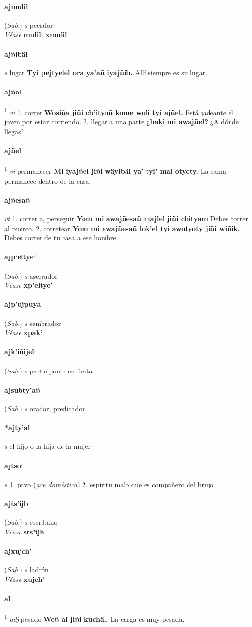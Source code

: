 \documentclass{scrbook}
\newcommand{\entry}[1]{\paragraph{#1}}
\newcommand{\onedefinition}[1]{#1.}
\newcommand{\defsuperscript}[1]{\textsuperscript{1}}
\newcommand{\partofspeech}[1]{\textit{#1}}
\newcommand{\spanishtranslation}[1]{#1}
\newcommand{\clarification}[1]{(\textit{#1})}
\newcommand{\cholexample}[1]{\textbf{#1}}
\newcommand{\exampletranslation}[1]{#1}
\newcommand{\alsosee}[1]{\\\textit{Véase} \textbf{#1}}
\newcommand{\relevantdialect}[1]{(\textit{#1})}
\begin{document}
\begin{multicols}{2}
\entry{ajmulil}
\relevantdialect{Sab.}
\partofspeech{s}
\spanishtranslation{pecador}
\alsosee{mulil, xmulil}

\entry{ajñibäl}
\partofspeech{s}
\spanishtranslation{lugar}
\cholexample{Tyi pejtyelel ora ya'añ iyajñib.}
\exampletranslation{Allí siempre es su lugar.}

\entry{ajñel}
\defsuperscript{1}
\partofspeech{vi}
\onedefinition{1}
\spanishtranslation{correr}
\cholexample{Wosiña jiñi ch'ityoñ kome woli tyi ajñel.}
\exampletranslation{Está jadeante el joven por estar corriendo.}
\onedefinition{2}
\spanishtranslation{llegar a una parte}
\cholexample{¿baki mi awajñel?}
\exampletranslation{¿A dónde llegas?}

\entry{ajñel}
\defsuperscript{2}
\partofspeech{vi}
\spanishtranslation{permanecer}
\cholexample{Mi iyajñel jiñi wäyibäl ya' tyi' mal otyoty.}
\exampletranslation{La cama permanece dentro de la casa.}

\entry{ajñesañ}
\partofspeech{vt}
\onedefinition{1}
\spanishtranslation{correr a, perseguir}
\cholexample{Yom mi awajñesañ majlel jiñi chityam}
\exampletranslation{Debes correr al puerco.}
\onedefinition{2}
\spanishtranslation{corretear}
\cholexample{Yom mi awajñesañ lok'el tyi awotyoty jiñi wiñik.}
\exampletranslation{Debes correr de tu casa a ese hombre.}

\entry{ajp'eltye'}
\relevantdialect{Sab.}
\partofspeech{s}
\spanishtranslation{aserrador}
\alsosee{xp'eltye'}

\entry{ajp'ujpuya}
\relevantdialect{Sab.}
\partofspeech{s}
\spanishtranslation{sembrador}
\alsosee{xpak'}

\entry{ajk'iñijel}
\relevantdialect{Sab.}
\partofspeech{s}
\spanishtranslation{participante en fiesta}

\entry{ajsubty'añ}
\relevantdialect{Sab.}
\partofspeech{s}
\spanishtranslation{orador, predicador}

\entry{*ajty'al}
\partofspeech{s}
\spanishtranslation{el hijo o la hija de la mujer}

\entry{ajtso'}
\partofspeech{s}
\onedefinition{1}
\spanishtranslation{pavo}
\clarification{ave doméstica}
\onedefinition{2}
\spanishtranslation{espíritu malo que es compañero del brujo}

\entry{ajts'ijb}
\relevantdialect{Sab.}
\partofspeech{s}
\spanishtranslation{escribano}
\alsosee{sts'ijb}

\entry{ajxujch'}
\relevantdialect{Sab.}
\partofspeech{s}
\spanishtranslation{ladrón}
\alsosee{xujch'}

\entry{al}
\defsuperscript{1}
\partofspeech{adj}
\spanishtranslation{pesado}
\cholexample{Weñ al jiñi kuchäl.}
\exampletranslation{La carga es muy pesada.}


\end{multicols}
\end{document}
